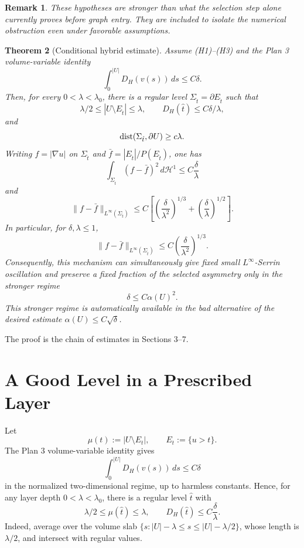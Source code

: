 \documentclass[11pt]{article}
\newtheorem{theorem}{Theorem}[section]
\newtheorem{remark}[theorem]{Remark}
\begin{document}
\begin{remark}
These hypotheses are stronger than what the selection step alone currently
proves before graph entry.  They are included to isolate the numerical
obstruction even under favorable assumptions.
\end{remark}

\begin{theorem}[Conditional hybrid estimate]\label{thm:conditional-hybrid}
Assume (H1)--(H3) and the Plan 3 volume-variable identity
\[
   \int_0^{|U|}D_H(v(s))\,ds\le C\delta.
\]
Then, for every \(0<\lambda<\lambda_0\), there is a regular level
\(\Sigma_{\hat t}=\partial E_{\hat t}\) such that
\[
   \lambda/2\le |U\setminus E_{\hat t}|\le \lambda,
   \qquad
   D_H(\hat t)\le C\delta/\lambda,
\]
and
\[
   {\rm dist}(\Sigma_{\hat t},\partial U)\ge c\lambda.
\]
Writing \(f=|\nabla u|\) on \(\Sigma_{\hat t}\) and
\(\bar f=|E_{\hat t}|/P(E_{\hat t})\), one has
\[
   \int_{\Sigma_{\hat t}}(f-\bar f)^2\,d\mathcal H^1
      \le C\frac{\delta}{\lambda}
\]
and
\[
   \|f-\bar f\|_{L^\infty(\Sigma_{\hat t})}
      \le
      C\left[
        \left(\frac{\delta}{\lambda^2}\right)^{1/3}
        +\left(\frac{\delta}{\lambda}\right)^{1/2}
      \right].
\]
In particular, for \(\delta,\lambda\le1\),
\[
   \|f-\bar f\|_{L^\infty(\Sigma_{\hat t})}
      \le C\left(\frac{\delta}{\lambda^2}\right)^{1/3}.
\]
Consequently, this mechanism can simultaneously give fixed small
\(L^\infty\)-Serrin oscillation and preserve a fixed fraction of the
selected asymmetry only in the stronger regime
\[
   \delta\le C\alpha(U)^2.
\]
This stronger regime is automatically available in the bad alternative of
the desired estimate \(\alpha(U)\le C\sqrt\delta\).
\end{theorem}

The proof is the chain of estimates in Sections 3--7.

\section{A Good Level in a Prescribed Layer}

Let
\[
   \mu(t):=|U\setminus E_t|,\qquad E_t:=\{u>t\}.
\]
The Plan 3 volume-variable identity gives
\[
   \int_0^{|U|} D_H(v(s))\,ds \le C\delta
\]
in the normalized two-dimensional regime, up to harmless constants.  Hence,
for any layer depth \(0<\lambda<\lambda_0\), there is a regular level
\(\hat t\) with
\[
   \lambda/2\le \mu(\hat t)\le\lambda,
   \qquad
   D_H(\hat t)\le C\frac{\delta}{\lambda}.
   \tag{3.1}\label{eq:good-level-lambda}
\]
Indeed, average over the volume slab
\(\{s: |U|-\lambda\le s\le |U|-\lambda/2\}\), whose length is \(\lambda/2\),
and intersect with regular values.
\end{document}
